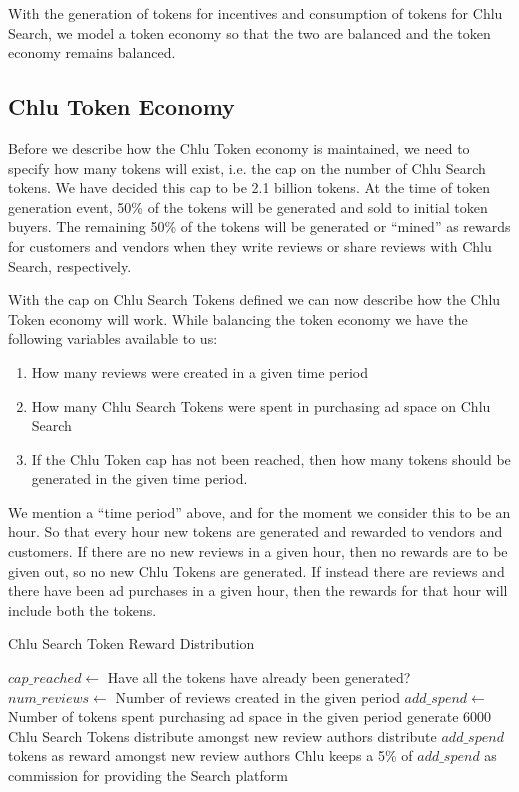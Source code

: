 \documentclass[a4paper]{article}
\begin{document}
With the generation of tokens for incentives and consumption of tokens
for Chlu Search, we model a token economy so that the two are balanced
and the token economy remains balanced.

\subsection{Chlu Token Economy}

Before we describe how the Chlu Token economy is maintained, we need
to specify how many tokens will exist, i.e. the cap on the number of
Chlu Search tokens. We have decided this cap to be 2.1 billion
tokens. At the time of token generation event, 50\% of the tokens will
be generated and sold to initial token buyers. The remaining 50\% of
the tokens will be generated or ``mined'' as rewards for customers and
vendors when they write reviews or share reviews with Chlu Search,
respectively.

With the cap on Chlu Search Tokens defined we can now describe how the
Chlu Token economy will work. While balancing the token economy we
have the following variables available to us:

\begin{enumerate}
\item How many reviews were created in a given time period
\item How many Chlu Search Tokens were spent in purchasing ad space on
  Chlu Search
\item If the Chlu Token cap has not been reached, then how many tokens
  should be generated in the given time period.
\end{enumerate}

We mention a ``time period'' above, and for the moment we consider
this to be an hour. So that every hour new tokens are generated and
rewarded to vendors and customers. If there are no new reviews in a
given hour, then no rewards are to be given out, so no new Chlu Tokens
are generated. If instead there are reviews and there have been ad
purchases in a given hour, then the rewards for that hour will include
both the tokens.

\begin{algorithm}
  \caption{Chlu Search Token Reward Distribution}
  \label{reward-algo}
  \begin{algorithmic}
    \STATE $cap\_reached \leftarrow$ Have all the tokens have already been generated?
    \STATE $num\_reviews \leftarrow$ Number of reviews created in the given period
    \STATE $add\_spend \leftarrow$ Number of tokens spent purchasing ad space in the given period
    \STATE generate $6000$ Chlu Search Tokens
    \STATE distribute amongst new review authors
    \STATE distribute $add\_spend$ tokens as reward amongst new review authors
    \STATE Chlu keeps a 5\% of $add\_spend$ as  commission for providing the Search platform
    \ENDIF
  \end{algorithmic}    
\end{algorithm}
\end{document}
